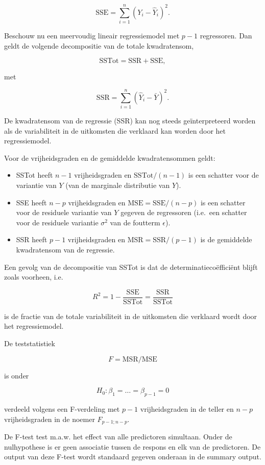 \documentclass[
  dutch,
  letterpaper,
  12pt]{book}
\providecommand{\tightlist}{%
  \setlength{\itemsep}{0pt}\setlength{\parskip}{0pt}}
\theoremstyle{definition}
\theoremstyle{definition}
\theoremstyle{definition}
\theoremstyle{remark}
\begin{document}
\[
  \text{SSE} = \sum_{i=1}^n (Y_i-\hat{Y}_i)^2.
\]

Beschouw nu een meervoudig lineair regressiemodel met \(p-1\)
regressoren. Dan geldt de volgende decompositie van de totale
kwadratensom,

\[
  \text{SSTot} = \text{SSR} + \text{SSE} ,
\]

met

\[
  \text{SSR} = \sum_{i=1}^n (\hat{Y}_i-\bar{Y})^2.
\]

De kwadratensom van de regressie (SSR) kan nog steeds geïnterpreteerd
worden als de variabiliteit in de uitkomsten die verklaard kan worden
door het regressiemodel.

Voor de vrijheidsgraden en de gemiddelde kwadratensommen geldt:

\begin{itemize}
\tightlist
\item
  SSTot heeft \(n-1\) vrijheidsgraden en \(\text{SSTot}/(n-1)\) is een
  schatter voor de variantie van \(Y\) (van de marginale distributie van
  \(Y\)).
\item
  SSE heeft \(n-p\) vrijheidsgraden en \(\text{MSE}=\text{SSE}/(n-p)\)
  is een schatter voor de residuele variantie van \(Y\) gegeven de
  regressoren (i.e.~een schatter voor de residuele variantie
  \(\sigma^2\) van de foutterm \(\epsilon\)).
\item
  SSR heeft \(p-1\) vrijheidsgraden en \(\text{MSR}=\text{SSR}/(p-1)\)
  is de gemiddelde kwadratensom van de regressie.
\end{itemize}

Een gevolg van de decompositie van SSTot is dat de
determinatiecoëfficiënt blijft zoals voorheen, i.e.

\[
  R^2 = 1-\frac{\text{SSE}}{\text{SSTot}} = \frac{\text{SSR}}{\text{SSTot}}
\]

is de fractie van de totale variabiliteit in de uitkomsten die verklaard
wordt door het regressiemodel.

De teststatistiek

\[
F=\text{MSR}/\text{MSE}
\]

is onder

\[H_0:\beta_1=\ldots=\beta_{p-1}=0\]

verdeeld volgens een F-verdeling met \(p-1\) vrijheidsgraden in de
teller en \(n-p\) vrijheidsgraden in de noemer \(F_{p-1;n-p}\).

De F-test test m.a.w. het effect van alle predictoren simultaan. Onder
de nulhypothese is er geen associatie tussen de respons en elk van de
predictoren. De output van deze F-test wordt standaard gegeven onderaan
in de summary output.
\end{document}
